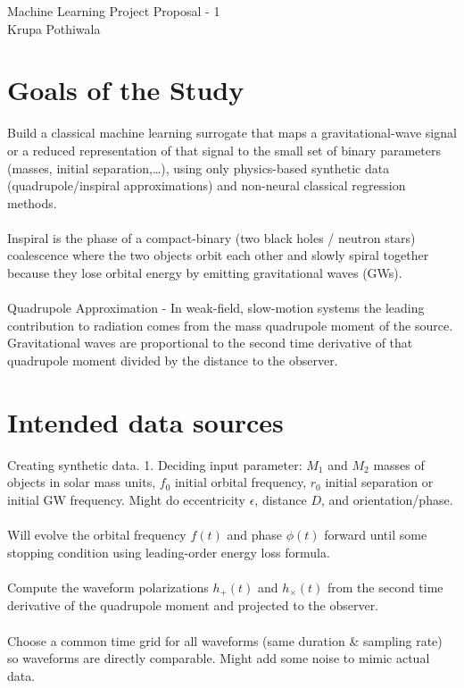 \documentclass[12pt]{article}
\begin{document}
\begin{center}
    \LARGE{Machine Learning Project Proposal - 1}\\
    \large{Krupa Pothiwala}
\end{center}


\section{Goals of the Study}
Build a classical machine learning surrogate that maps a gravitational-wave signal or a reduced representation of that signal to the small set of binary parameters (masses, initial separation,…), using only physics-based synthetic data (quadrupole/inspiral approximations) and non-neural classical regression methods.
\\
\\
Inspiral is the phase of a compact-binary (two black holes / neutron stars) coalescence where the two objects orbit each other and slowly spiral together because they lose orbital energy by emitting gravitational waves (GWs).
\\
\\
Quadrupole Approximation - In weak-field, slow-motion systems the leading contribution to radiation comes from the mass quadrupole moment of the source. Gravitational waves are proportional to the second time derivative of that quadrupole moment divided by the distance to the observer.

\section{Intended data sources}
Creating synthetic data. 
1. Deciding input parameter: $M_1$ and $M_2$ masses of objects in solar mass units, $f_0$ initial orbital frequency, $r_0$ initial separation or initial GW frequency. Might do eccentricity $\epsilon$, distance $D$, and orientation/phase.
\\
\\Will evolve the orbital frequency 
$f(t)$ and phase $\phi(t)$ forward until some stopping condition using leading-order energy loss formula.
\\
\\Compute the waveform polarizations $h_+(t)$ and $h_\times(t)$ from the second time derivative of the quadrupole moment and projected to the observer.
\\
\\Choose a common time grid for all waveforms (same duration \& sampling rate) so waveforms are directly comparable. Might add some noise to mimic actual data.
\end{document}
